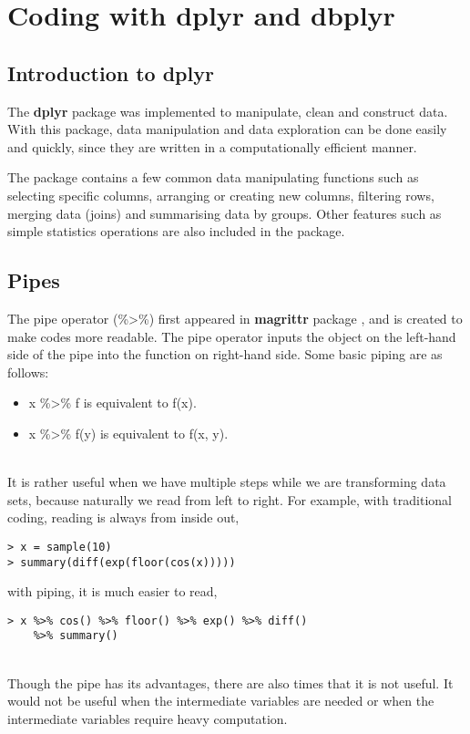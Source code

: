 \section{Coding with {\bf dplyr} and {\bf dbplyr}}

\subsection{Introduction to dplyr} \label{c1.2.1}
The {\bf dplyr} package was implemented to manipulate, clean and construct data. With this package, data manipulation and data exploration can be done easily and quickly, since they are written in a computationally efficient manner. 

The package contains a few common data manipulating functions such as selecting specific columns, arranging or creating new columns, filtering rows, merging data (joins) and summarising data by groups. Other features such as simple statistics operations are also included in the package.

\subsection{Pipes}
The pipe operator ({\ttfamily \%>\%}) first appeared in {\bf magrittr} package \citep{magrittrpackage}, and is created to make codes more readable.
The pipe operator inputs the object on the left-hand side of the pipe into the function on right-hand side. Some basic piping are as follows:

\begin{itemize}

\item {\ttfamily x \%>\% f} is equivalent to {\ttfamily f(x).}

\item {\ttfamily x \%>\% f(y)} is equivalent to {\ttfamily f(x, y).} 

\end{itemize}
\\
\vspace{10}
It is rather useful when we have multiple steps while we are transforming data sets, because naturally we read from left to right. For example, with traditional coding, reading is always from inside out,
\begin{lstlisting}
> x = sample(10)
> summary(diff(exp(floor(cos(x)))))
\end{lstlisting}
with piping, it is much easier to read,
\begin{lstlisting}
> x %>% cos() %>% floor() %>% exp() %>% diff() 
    %>% summary() 
\end{lstlisting}
\\
\vspace{10}
Though the pipe has its advantages, there are also times that it is not useful. It would not be useful when the intermediate variables are needed or when the intermediate variables require heavy computation.

